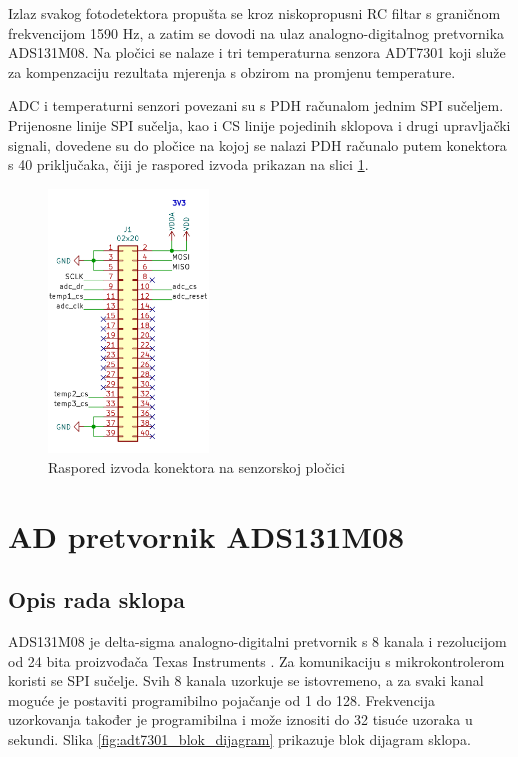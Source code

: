         Izlaz svakog fotodetektora propušta se kroz niskopropusni RC filtar s graničnom frekvencijom 1590 Hz, a zatim se dovodi na ulaz analogno-digitalnog pretvornika ADS131M08. Na pločici se nalaze i tri temperaturna senzora ADT7301 koji služe za kompenzaciju rezultata mjerenja s obzirom na promjenu temperature.
        
        ADC i temperaturni senzori povezani su s PDH računalom jednim SPI sučeljem. Prijenosne linije SPI sučelja, kao i CS linije pojedinih sklopova i drugi upravljački signali, dovedene su do pločice na kojoj se nalazi PDH računalo putem konektora s 40 priključaka, čiji je raspored izvoda prikazan na slici \ref{fig:konektor}.

        \begin{figure}[h]
            \centering
            \includegraphics[height=7cm]{slike/konektor.png}
            \caption{Raspored izvoda konektora na senzorskoj pločici}
            \label{fig:konektor}
        \end{figure}

    \section{AD pretvornik ADS131M08}

        \subsection{Opis rada sklopa}
        ADS131M08 je delta-sigma analogno-digitalni pretvornik s 8 kanala i rezolucijom od 24 bita proizvođača Texas Instruments \cite{ads131m08_datasheet}. Za komunikaciju s mikrokontrolerom koristi se SPI sučelje. Svih 8 kanala uzorkuje se istovremeno, a za svaki kanal moguće je postaviti programibilno pojačanje od 1 do 128. Frekvencija uzorkovanja također je programibilna i može iznositi do 32 tisuće uzoraka u sekundi. Slika \ref{fig:adt7301_blok_dijagram} prikazuje blok dijagram sklopa.

